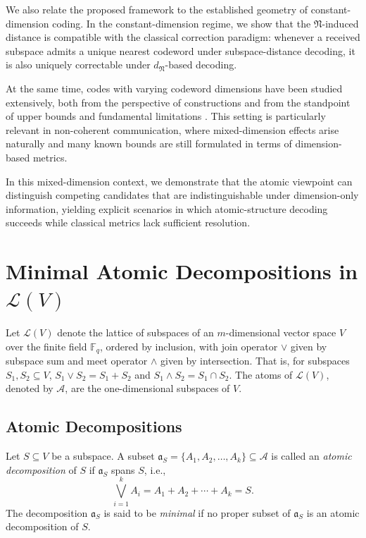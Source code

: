 \documentclass{svproc}
\begin{document}
We also relate the proposed framework to the established geometry of constant-dimension coding. 
In the constant-dimension regime, we show that the $\mathfrak{N}$-induced distance is compatible with the classical correction paradigm: whenever a received subspace admits a unique nearest codeword under subspace-distance decoding, it is also uniquely correctable under $d_{\mathfrak{N}}$-based decoding. 

At the same time, codes with varying codeword dimensions have been studied extensively, both from the perspective of constructions and from the standpoint of upper bounds and fundamental limitations \cite{kurz2025bounds,honold2019johnson}. 
This setting is particularly relevant in non-coherent communication, where mixed-dimension effects arise naturally and many known bounds are still formulated in terms of dimension-based metrics. 

In this mixed-dimension context, we demonstrate that the atomic viewpoint can distinguish competing candidates that are indistinguishable under dimension-only information, yielding explicit scenarios in which atomic-structure decoding succeeds while classical metrics lack sufficient resolution.


\section{Minimal Atomic Decompositions in $\mathcal{L}(V)$}
\label{sec:minimal_atomic_decompositions}


Let $\mathcal L(V)$ denote the lattice of subspaces of an $m$-dimensional vector
space $V$ over the finite field $\mathbb{F}_q$, ordered by inclusion, with join operator $\vee$
given by subspace sum and meet operator $\wedge$ given by intersection.
That is, for subspaces $S_1,S_2 \subseteq V$,
\(S_1 \vee S_2 = S_1 + S_2\) and 
\(S_1 \wedge S_2 = S_1 \cap S_2
\).
The atoms of $\mathcal L(V)$, denoted by $\mathcal A$, are the one-dimensional
subspaces of $V$.

\subsection{Atomic Decompositions}

\begin{definition}
Let $S \subseteq V$ be a subspace.
A subset
\(
\mathfrak a_S = \{A_1,A_2,\ldots,A_k\} \subseteq \mathcal A
\)
is called an \emph{atomic decomposition} of $S$ if $\mathfrak a_S$ spans $S$, i.e.,
\[
\bigvee_{i=1}^k A_i=A_1 + A_2 + \cdots + A_k = S.
\]
The decomposition $\mathfrak a_S$ is said to be \emph{minimal} if no proper subset
of $\mathfrak a_S$ is an atomic decomposition of $S$.
\end{definition}
\end{document}
